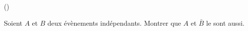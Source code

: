 \begin{exercice}\label{exo3-11} (\minsyndical)

Soient $A$ et $B$ deux \'ev\`enements ind\'ependants. Montrer que $A$ et $\bar{B}$ le sont aussi.\\


\end{exercice}
